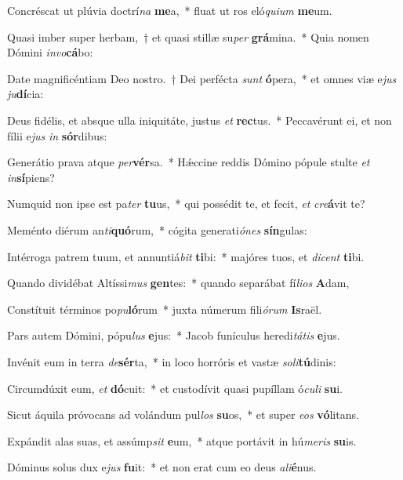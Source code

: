 \item Concréscat ut plúvia doctrí\textit{na} \textbf{me}a,~* fluat ut ros eló\textit{qui}\textit{um} \textbf{me}um.
\item Quasi imber super herbam,~† et quasi stillæ su\textit{per} \textbf{grá}mina.~* Quia nomen Dómini \textit{in}\textit{vo}\textbf{cá}bo:
\item Date magnificéntiam Deo nostro.~† Dei perfécta \textit{sunt} \textbf{ó}pera,~* et omnes viæ e\textit{jus} \textit{ju}\textbf{dí}cia:
\item Deus fidélis, et absque ulla iniquitáte, justus \textit{et} \textbf{rec}tus.~* Peccavérunt ei, et non fílii e\textit{jus} \textit{in} \textbf{sór}dibus:
\item Generátio prava atque \textit{per}\textbf{vér}sa.~* Hǽccine reddis Dómino pópule stulte \textit{et} \textit{in}\textbf{sí}piens?
\item Numquid non ipse est pa\textit{ter} \textbf{tu}us,~* qui possédit te, et fecit, \textit{et} \textit{cre}\textbf{á}vit te?
\item Meménto diérum an\textit{ti}\textbf{quó}rum,~* cógita generati\textit{ó}\textit{nes} \textbf{sín}gulas:
\item Intérroga patrem tuum, et annuntiá\textit{bit} \textbf{ti}bi:~* majóres tuos, et \textit{di}\textit{cent} \textbf{ti}bi.
\item Quando dividébat Altíssi\textit{mus} \textbf{gen}tes:~* quando separábat fí\textit{li}\textit{os} \textbf{A}dam,
\item Constítuit términos po\textit{pu}\textbf{ló}rum~* juxta númerum fili\textit{ó}\textit{rum} \textbf{Is}raël.
\item Pars autem Dómini, pópu\textit{lus} \textbf{e}jus:~* Jacob funículus heredi\textit{tá}\textit{tis} \textbf{e}jus.
\item Invénit eum in terra \textit{de}\textbf{sér}ta,~* in loco horróris et vastæ \textit{so}\textit{li}\textbf{tú}dinis:
\item Circumdúxit eum, \textit{et} \textbf{dó}cuit:~* et custodívit quasi pupíllam ó\textit{cu}\textit{li} \textbf{su}i.
\item Sicut áquila próvocans ad volándum pul\textit{los} \textbf{su}os,~* et super \textit{e}\textit{os} \textbf{vó}litans.
\item Expándit alas suas, et assúmp\textit{sit} \textbf{e}um,~* atque portávit in hú\textit{me}\textit{ris} \textbf{su}is.
\item Dóminus solus dux e\textit{jus} \textbf{fu}it:~* et non erat cum eo deus \textit{a}\textit{li}\textbf{é}nus.
